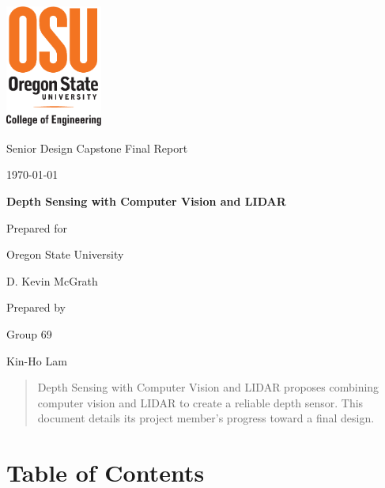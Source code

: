 \documentclass[onecolumn, draftclsnofoot,10pt, compsoc]{IEEEtran}
\def \CapstoneTeamName{			}
\def \CapstoneTeamNumber{		69}
\def \GroupMemberOne{			Kin-Ho Lam}
\def \CapstoneProjectName{		Depth Sensing with Computer Vision and LIDAR}
\def \CapstoneSponsorCompany{	Oregon State University}
\def \CapstoneSponsorPerson{	D. Kevin McGrath}
\def \DocType{
	Final Report
}
\newcommand{\NameSigPair}[1]{\par
	\makebox[2.75in][r]{#1} \hfil 	\makebox[3.25in]{\makebox[2.25in]{\hrulefill} \hfill		\makebox[.75in]{\hrulefill}}
	\par\vspace{-12pt} \textit{\tiny\noindent
		\makebox[2.75in]{} \hfil		\makebox[3.25in]{\makebox[2.25in][r]{Signature} \hfill	\makebox[.75in][r]{Date}}}}
\renewcommand{\NameSigPair}[1]{#1}
\begin{document}
	\begin{titlepage}
		\begin{singlespace}
			\centering
			\includegraphics[height=4cm,natwidth=345,natheight=435]{images/osu_logo.png}
			\hfill 
			\par\vspace{.2in}
			\centering
			\scshape{
				\huge Senior Design Capstone \DocType \par
				{\large\today}\par
				\vspace{.5in}
				\textbf{\Huge\CapstoneProjectName}\par
				\vfill
				{\large Prepared for}\par
				\Huge \CapstoneSponsorCompany\par
				\vspace{5pt}
				{\Large\NameSigPair{\CapstoneSponsorPerson}\par}
				{\large Prepared by }\par
				Group\CapstoneTeamNumber\par
				\CapstoneTeamName\par 
				\vspace{5pt}
				{\large
					\NameSigPair{\GroupMemberOne}\par
				}
				\vspace{20pt}
			}
			\begin{abstract}  
 				Depth Sensing with Computer Vision and LIDAR proposes combining computer vision and LIDAR to create a reliable depth sensor.
				This document details its project member's progress toward a final design.
			\end{abstract}     
		\end{singlespace}
	\end{titlepage}
\section{Table of Contents}
\tableofcontents


\clearpage
\end{document}
